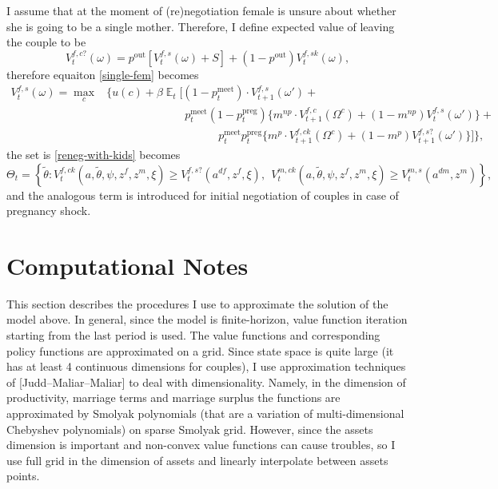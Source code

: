 \documentclass[12pt,letter]{article}
\DeclareMathOperator{\E}{\mathbb{E}}
\begin{document}
I assume that at the moment of (re)negotiation female is unsure about whether she is going to be a single mother. Therefore, I define expected value of leaving the couple to be
\[V_t^{f,c?}(\omega) = p^{\text{out}}[V_t^{f,s}(\omega) + S] + (1-p^{\text{out}})V_t^{f,sk}(\omega),\]
therefore equaiton \ref{single-fem} becomes
\begin{align}V^{f,s}_t(\omega) = \max\limits_{c} & \bigg\{ u(c) + \beta \E_t \Big[ (1 - p^{\text{meet}}_t)\cdot V^{f,s}_{t+1}(\omega') + \label{single-fem-true} \\  \nonumber
& \hspace{7em} p^{\text{meet}}_t (1-p^{\text{preg}}_t) \big\{ m^{np} \cdot V^{f,c}_{t+1}(\Omega^c) + (1-m^{np})V^{f,s}_t(\omega')\big\} + \\  \nonumber
& \hspace{10em} p^{\text{meet}}_t p^{\text{preg}}_t \big\{ m^{p} \cdot V^{f,ck}_{t+1}(\Omega^c) + (1-m^{p})V^{f,s?}_{t+1}(\omega')\big\}  \Big]  \bigg\},
\end{align}
the set is \ref{reneg-with-kids} becomes
\begin{equation}\Theta_t = \left\{ \tilde\theta : V^{f,ck}_t(a,\tilde\theta,\psi,z^f,z^m,\xi) \geq V_t^{f,s?}(a^{df},z^f,\xi) , \ \ V_t^{m,ck}(a,\tilde\theta,\psi,z^f,z^m,\xi)\geq V_t^{m,s}(a^{dm},z^m) \right\} \label{reneg-with-kids}
,\end{equation}
and the analogous term is introduced for initial negotiation of couples in case of pregnancy shock.

\section{Computational Notes}
This section describes the procedures I use to approximate the solution of the model above. In general, since the model is finite-horizon, value function iteration starting from the last period is used. The value functions and corresponding policy functions are approximated on a grid. Since state space is quite large (it has at least 4 continuous dimensions for couples), I use approximation techniques of [Judd--Maliar--Maliar] to deal with dimensionality. Namely, in the dimension of productivity, marriage terms and marriage surplus the functions are approximated by Smolyak polynomials (that are a variation of multi-dimensional Chebyshev polynomials) on sparse Smolyak grid. However, since the assets dimension is important and non-convex value functions can cause troubles, so I use full grid in the dimension of assets and linearly interpolate between assets points.
\end{document}
